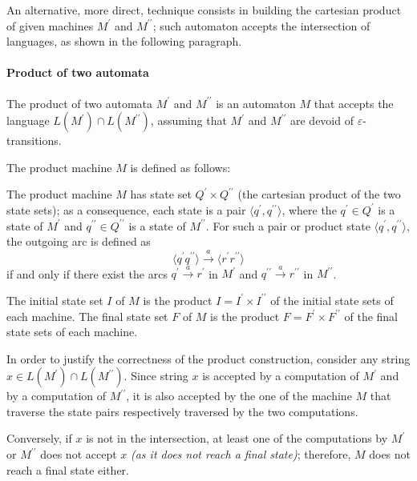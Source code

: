 \documentclass[english]{article}
\begin{document}
An alternative, more direct, technique consists in building the cartesian product of given machines \(M^\prime\) and \(M^{\prime\prime}\);
such automaton accepts the intersection of languages, as shown in the following paragraph.

\paragraph{Product of two automata}

The product of two automata \(M^\prime\) and \(M^{\prime\prime}\) is an automaton \(M\) that accepts the language \(L(M^\prime) \cap L(M^{\prime\prime})\), assuming that \(M^\prime\) and \(M^{\prime\prime}\) are devoid of \(\varepsilon\)-transitions.

The product machine \(M\) is defined as follows:

The product machine \(M\) has state set \(Q^\prime \times Q^{\prime\prime}\) (the cartesian product of the two state sets);
as a consequence, each state is a pair \(\langle q^\prime,q^{\prime\prime} \rangle\), where the \(q^\prime \in Q^\prime\) is a state of \(M^\prime\) and \(q^{\prime\prime} \in Q^{\prime\prime}\) is a state of \(M^{\prime\prime}\).
For such a pair or product state \(\langle q^\prime,q^{\prime\prime} \rangle\), the outgoing arc is defined as
\[ \langle q^\prime q^{\prime\prime} \rangle \xrightarrow{a} \langle r^\prime r^{\prime\prime} \rangle \]
if and only if there exist the arcs \(q^\prime \xrightarrow{a} r^\prime\) in \(M^\prime\) and \(q^{\prime\prime} \xrightarrow{a} r^{\prime\prime}\) in \(M^{\prime\prime}\).

The initial state set \(I\) of \(M\) is the product \(I = I^\prime \times I^{\prime\prime}\) of the initial state sets of each machine.
The final state set \(F\) of \(M\) is the product \(F = F^\prime \times F^{\prime\prime}\) of the final state sets of each machine.

\bigskip
In order to justify the correctness of the product construction, consider any string \(x \in L(M^\prime) \cap L(M^{\prime\prime})\).
Since string \(x\) is accepted by a computation of \(M^\prime\) and by a computation of \(M^{\prime\prime}\), it is also accepted by the one of the machine \(M\) that traverse the state pairs respectively traversed by the two computations.

Conversely, if \(x\) is not in the intersection, at least one of the computations by \(M^\prime\) or \(M^{\prime\prime}\) does not accept \(x\) \textit{(as it does not reach a final state)};
therefore, \(M\) does not reach a final state either.
\end{document}
